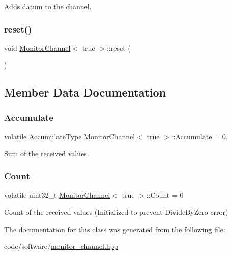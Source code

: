 Adds datum to the channel. 

\mbox{\label{classMonitorChannel_3_01true_01_4_a4d555de31d53efa329c4598538da59e7}} 
\subsubsection{\texorpdfstring{reset()}{reset()}}
{\footnotesize\ttfamily void \hyperlink{classMonitorChannel}{Monitor\+Channel}$<$ true $>$\+::reset (\begin{DoxyParamCaption}{ }\end{DoxyParamCaption})\hspace{0.3cm}{\ttfamily [inline]}}



\subsection{Member Data Documentation}
\mbox{\label{classMonitorChannel_3_01true_01_4_a8453948b697c84ac31a0d3d6305e7e9a}} 
\subsubsection{\texorpdfstring{Accumulate}{Accumulate}}
{\footnotesize\ttfamily volatile \hyperlink{classMonitorChannel_3_01true_01_4_af2569e58417243595e129831ac287351}{Accumulate\+Type} \hyperlink{classMonitorChannel}{Monitor\+Channel}$<$ true $>$\+::Accumulate = 0.}



Sum of the received values. 

\mbox{\label{classMonitorChannel_3_01true_01_4_a7c4f5908f8b795e1a951cc8224a68de7}} 
\subsubsection{\texorpdfstring{Count}{Count}}
{\footnotesize\ttfamily volatile uint32\+\_\+t \hyperlink{classMonitorChannel}{Monitor\+Channel}$<$ true $>$\+::Count = 0}



Count of the received values (Initialized to prevent Divide\+By\+Zero error) 



The documentation for this class was generated from the following file\+:\begin{DoxyCompactItemize}
\item 
code/software/\hyperlink{monitor__channel_8hpp}{monitor\+\_\+channel.\+hpp}\end{DoxyCompactItemize}
